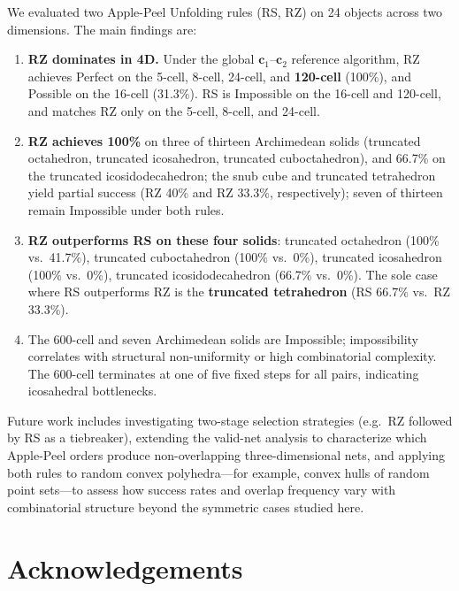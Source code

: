 \documentclass[12pt]{article}
\theoremstyle{definition}
\begin{document}
We evaluated two Apple-Peel Unfolding rules (RS, RZ) on 24 objects
across two dimensions.
The main findings are:
\begin{enumerate}
  \item \textbf{RZ dominates in 4D.}
        Under the global $\mathbf{c}_1$--$\mathbf{c}_2$ reference algorithm, RZ achieves
        Perfect on the 5-cell, 8-cell, 24-cell, and \textbf{120-cell} (100\%),
        and Possible on the 16-cell (31.3\%).
        RS is Impossible on the 16-cell and 120-cell, and matches RZ only
        on the 5-cell, 8-cell, and 24-cell.
  \item \textbf{RZ achieves 100\%} on three of thirteen Archimedean
        solids (truncated octahedron, truncated icosahedron, truncated
        cuboctahedron), and 66.7\% on the truncated icosidodecahedron;
        the snub cube and truncated tetrahedron yield partial success
        (RZ 40\% and RZ 33.3\%, respectively);
        seven of thirteen remain Impossible under both rules.
  \item \textbf{RZ outperforms RS on these four solids}:
        truncated octahedron (100\% vs.\ 41.7\%),
        truncated cuboctahedron (100\% vs.\ 0\%),
        truncated icosahedron (100\% vs.\ 0\%),
        truncated icosidodecahedron (66.7\% vs.\ 0\%).
        The sole case where RS outperforms RZ is the
        \textbf{truncated tetrahedron} (RS 66.7\% vs.\ RZ 33.3\%).
  \item The 600-cell and seven Archimedean solids are Impossible;
        impossibility correlates with structural non-uniformity or
        high combinatorial complexity.
        The 600-cell terminates at one of five fixed steps for all pairs,
        indicating icosahedral bottlenecks.
\end{enumerate}

Future work includes investigating two-stage selection strategies
(e.g.\ RZ followed by RS as a tiebreaker),
extending the valid-net analysis to characterize which
Apple-Peel orders produce non-overlapping three-dimensional nets,
and applying both rules to random convex polyhedra---for example,
convex hulls of random point sets---to assess how success rates
and overlap frequency vary with combinatorial structure
beyond the symmetric cases studied here.

\section*{Acknowledgements}
\end{document}
